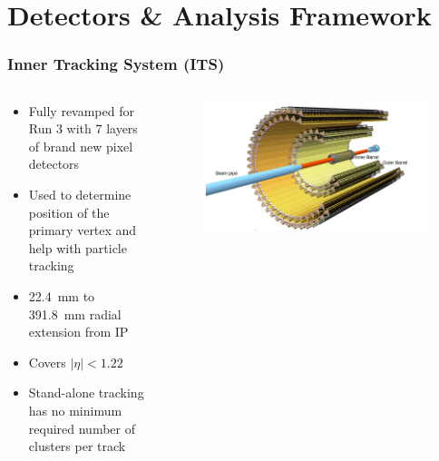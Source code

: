 \documentclass[10pt]{beamer}
\begin{document}
\section{Detectors \& Analysis Framework}

\begin{frame}
    \frametitle{Inner Tracking System (ITS)}

    \begin{columns}[c]
        \begin{column}{0.4\textwidth}
            \begin{itemize}
                \item Fully revamped for Run 3 with 7 layers of brand new pixel detectors
                \item Used to determine position of the primary vertex and help with particle tracking
                \item \SI{22.4}{\milli\metre} to \SI{391.8}{\milli\metre} radial extension from IP
                \item Covers $|\eta| < 1.22$
                \item Stand-alone tracking has no minimum required number of clusters per track
            \end{itemize}
        \end{column}

        \begin{column}{0.6\textwidth}
            \begin{figure}[h]
                \begin{center}
                    \includegraphics[width=\textwidth]{Figs/ITS_Schematic.png}
                \end{center}
            \end{figure}
        \end{column}
    \end{columns}

\end{frame}
\end{document}
